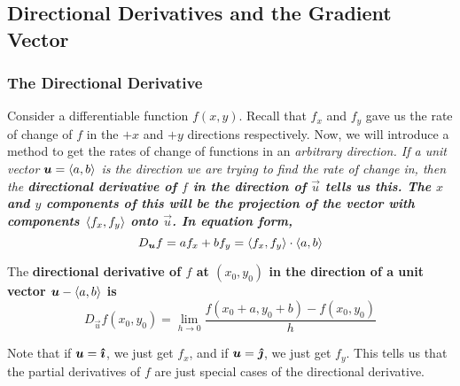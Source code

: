 \subsection{Directional Derivatives and the Gradient Vector}
\subsubsection{The Directional Derivative}
Consider a differentiable function \(f(x,y)\). Recall that \(f_x\) and \(f_y\) gave us the rate of change of \(f\) in the \(+x\) and \(+y\) directions respectively. Now, we will introduce a method to get the rates of change of functions in an \it{arbitrary} direction. If a unit vector \(\boldsymbol{u} = \left\langle a, b\right\rangle\) is the direction we are trying to find the rate of change in, then the \bf{directional derivative} of \(f\) in the direction of \(\vec u\) tells us this. The \(x\) and \(y\) components of this will be the projection of the vector with components \(\left\langle f_x, f_y\right\rangle\) onto \(\vec u\). In equation form,
\[ D_{\boldsymbol{u}} f = af_x + bf_y = \left\langle f_x, f_y\right\rangle \cdot\left\langle a, b\right\rangle \] 
\begin{definition}
    The \bf{directional derivative} of \(f\) at \((x_0, y_0)\) in the direction of a unit vector \(\boldsymbol{u} - \left\langle a, b\right\rangle\) is
    \[ D_{\vec u}f(x_0, y_0) = \lim_{h\to 0}\frac{f(x_0+a, y_0+b) - f(x_0, y_0)}{h}\]
\end{definition}
Note that if \(\boldsymbol{u} = \boldsymbol{\hat{\imath}}\), we just get \(f_x\), and if \(\boldsymbol{u} = \boldsymbol{\hat{\jmath}}\), we just get \(f_y\). This tells us that the partial derivatives of \(f\) are just special cases of the directional derivative. 
